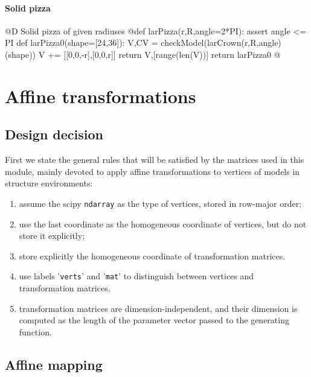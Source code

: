 \documentclass[11pt,oneside]{article}	%
\begin{document}
\paragraph{Solid pizza}
@D Solid pizza of given radiuses
@{def larPizza(r,R,angle=2*PI):
	assert angle <= PI
	def larPizza0(shape=[24,36]):
		V,CV = checkModel(larCrown(r,R,angle)(shape))
		V += [[0,0,-r],[0,0,r]]
		return V,[range(len(V))]
	return larPizza0
@}
\section{Affine transformations}
\subsection{Design decision}
First we state the general rules that will be satisfied by the matrices used in this module, mainly devoted to apply affine transformations to vertices of models in structure environments:
\begin{enumerate}
\item assume the scipy \texttt{ndarray} as the type of vertices, stored in row-major order;
\item use the last coordinate as the homogeneous coordinate of vertices, but do not store it explicitly;
\item store explicitly the homogeneous coordinate of transformation matrices.
\item use labels '\texttt{verts}' and '\texttt{mat}' to distinguish between vertices and transformation matrices.
\item transformation matrices are dimension-independent, and their dimension is computed as the length of the parameter vector passed to the generating function.
\end{enumerate}


\subsection{Affine mapping}
\end{document}
